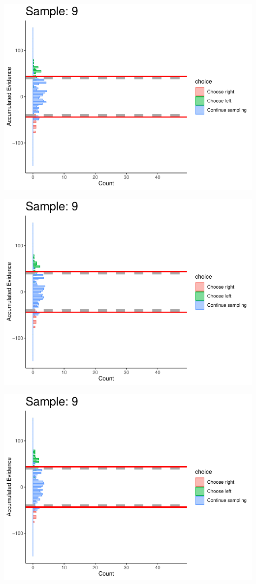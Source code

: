 \documentclass[
]{book}
\begin{document}
\begin{center}\includegraphics[width=0.8\linewidth]{LateNightBayes_files/figure-latex/collapsing_dcb-86} \end{center}

\begin{center}\includegraphics[width=0.8\linewidth]{LateNightBayes_files/figure-latex/collapsing_dcb-87} \end{center}

\begin{center}\includegraphics[width=0.8\linewidth]{LateNightBayes_files/figure-latex/collapsing_dcb-88} \end{center}
\end{document}
